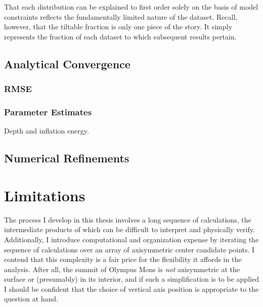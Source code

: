 That each distribution can be explained to first order solely on the basis of model constraints reflects the fundamentally limited nature of the dataset. Recall, however, that the tiltable fraction is only one piece of the story. It simply represents the fraction of each dataset to which subsequent results pertain. 


\subsection{Analytical Convergence}\label{sec:convergence}

\subsubsection{\acs{RMSE}}\label{sec:rmse}
\subsubsection{Parameter Estimates}\label{sec:parameter-estimates}

Depth and inflation energy.

\subsection{Numerical Refinements}

\section{Limitations}

The process I develop in this thesis involves a long sequence of calculations, the intermediate products of which can be difficult to interpret and physically verify. Additionally, I introduce computational and organization expense by iterating the sequence of calculations over an array of axisymmetric center candidate points. I contend that this complexity is a fair price for the flexibility it affords in the analysis. After all, the summit of Olympus Mons is \emph{not} axisymmetric at the surface or (presumably) in its interior, and if such a simplification is to be applied I should be confident that the choice of vertical axis position is appropriate to the question at hand.

